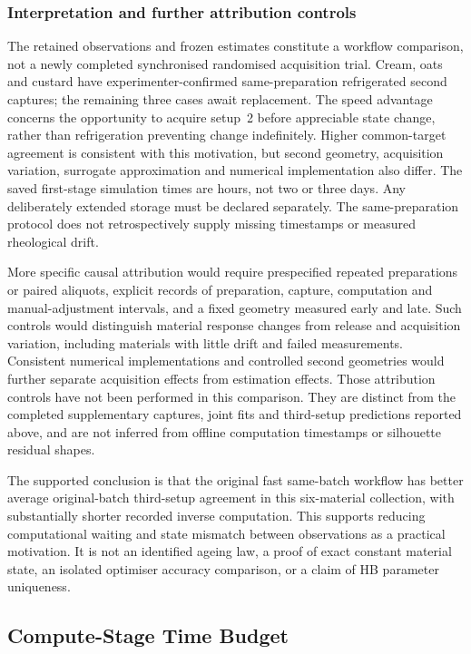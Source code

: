 \subsubsection{Interpretation and further attribution controls}
\label{sec:freshness-future-protocol}
The retained observations and frozen estimates constitute a workflow comparison, not a newly completed synchronised randomised acquisition trial. Cream, oats and custard have experimenter-confirmed same-preparation refrigerated second captures; the remaining three cases await replacement. The speed advantage concerns the opportunity to acquire setup~2 before appreciable state change, rather than refrigeration preventing change indefinitely. Higher common-target agreement is consistent with this motivation, but second geometry, acquisition variation, surrogate approximation and numerical implementation also differ. The saved first-stage simulation times are hours, not two or three days. Any deliberately extended storage must be declared separately. The same-preparation protocol does not retrospectively supply missing timestamps or measured rheological drift.

More specific causal attribution would require prespecified repeated
preparations or paired aliquots, explicit records of preparation,
capture, computation and manual-adjustment intervals, and a fixed
geometry measured early and late. Such controls would distinguish
material response changes from release and acquisition variation,
including materials with little drift and failed measurements.
Consistent numerical implementations and controlled second geometries
would further separate acquisition effects from estimation effects.
Those attribution controls have not been performed in this comparison.
They are distinct from the completed supplementary captures, joint
fits and third-setup predictions reported above, and are not inferred
from offline computation timestamps or silhouette residual shapes.

The supported conclusion is that the original fast same-batch workflow
has better average original-batch third-setup agreement in this
six-material collection, with substantially shorter recorded inverse
computation. This supports reducing computational waiting and state mismatch between observations as a practical motivation. It is
not an identified ageing law, a proof of exact constant material state,
an isolated optimiser accuracy comparison, or a claim of HB parameter
uniqueness.


\FloatBarrier
\subsection{Compute-Stage Time Budget}
\label{sec:timebudget}

